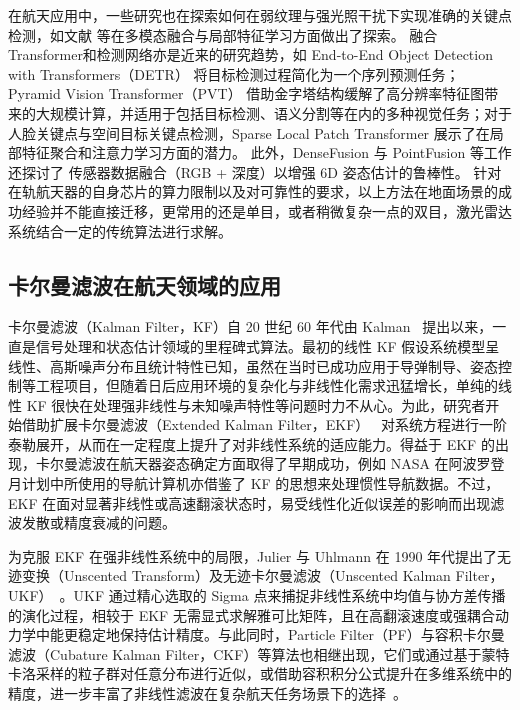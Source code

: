 在航天应用中，一些研究也在探索如何在弱纹理与强光照干扰下实现准确的关键点检测，如文献 \cite{Landrieu2018PointFusion, Simon2018BB8} 等在多模态融合与局部特征学习方面做出了探索。
融合Transformer和检测网络亦是近来的研究趋势，如 End-to-End Object Detection with Transformers（DETR）\cite{Carion2020EndToEnd} 将目标检测过程简化为一个序列预测任务；Pyramid Vision Transformer（PVT）\cite{Wang2021PyramidVisionTransformer} 借助金字塔结构缓解了高分辨率特征图带来的大规模计算，并适用于包括目标检测、语义分割等在内的多种视觉任务；对于人脸关键点与空间目标关键点检测，Sparse Local Patch Transformer \cite{Xia2022SparseLocalPatch} 展示了在局部特征聚合和注意力学习方面的潜力。
此外，DenseFusion \cite{Wang2019DenseFusion6D} 与 PointFusion \cite{Landrieu2018PointFusion} 等工作还探讨了 传感器数据融合（RGB + 深度）以增强 6D 姿态估计的鲁棒性。
针对在轨航天器的自身芯片的算力限制以及对可靠性的要求，以上方法在地面场景的成功经验并不能直接迁移，更常用的还是单目，或者稍微复杂一点的双目，激光雷达系统结合一定的传统算法进行求解。
\subsection{卡尔曼滤波在航天领域的应用}
卡尔曼滤波（Kalman Filter，KF）自 20 世纪 60 年代由 Kalman~\cite{kalman1960new} 提出以来，一直是信号处理和状态估计领域的里程碑式算法。最初的线性 KF 假设系统模型呈线性、高斯噪声分布且统计特性已知，虽然在当时已成功应用于导弹制导、姿态控制等工程项目，但随着日后应用环境的复杂化与非线性化需求迅猛增长，单纯的线性 KF 很快在处理强非线性与未知噪声特性等问题时力不从心。为此，研究者开始借助扩展卡尔曼滤波（Extended Kalman Filter，EKF）~\cite{jazwinski2007stochastic} 对系统方程进行一阶泰勒展开，从而在一定程度上提升了对非线性系统的适应能力。得益于 EKF 的出现，卡尔曼滤波在航天器姿态确定方面取得了早期成功，例如 NASA 在阿波罗登月计划中所使用的导航计算机亦借鉴了 KF 的思想来处理惯性导航数据。不过，EKF 在面对显著非线性或高速翻滚状态时，易受线性化近似误差的影响而出现滤波发散或精度衰减的问题。

为克服 EKF 在强非线性系统中的局限，Julier 与 Uhlmann 在 1990 年代提出了无迹变换（Unscented Transform）及无迹卡尔曼滤波（Unscented Kalman Filter，UKF）~\cite{Julier1997}。UKF 通过精心选取的 Sigma 点来捕捉非线性系统中均值与协方差传播的演化过程，相较于 EKF 无需显式求解雅可比矩阵，且在高翻滚速度或强耦合动力学中能更稳定地保持估计精度。与此同时，Particle Filter（PF）与容积卡尔曼滤波（Cubature Kalman Filter，CKF）等算法也相继出现，它们或通过基于蒙特卡洛采样的粒子群对任意分布进行近似，或借助容积积分公式提升在多维系统中的精度，进一步丰富了非线性滤波在复杂航天任务场景下的选择~\cite{9272767,AMCCKF_2023}。

